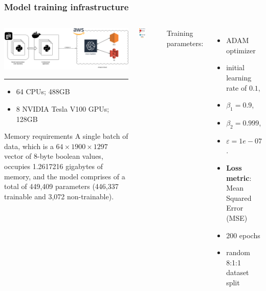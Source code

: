 \documentclass[a4paper,9pt]{beamer}
\theoremstyle{mytheoremstyle}
\begin{document}
\begin{frame}
\frametitle{Model training infrastructure}
\begin{columns}
\begin{column}{0.7\textwidth}
\begin{center}
  \includegraphics[width=\textwidth]{res/cloud_training}
\end{center}
\hrule
\begin{itemize}
\item 64 CPUs; 488GB
\item 8 NVIDIA Tesla V100 GPUs; 128GB
\end{itemize}
\scriptsize{
\begin{exampleblock}{Memory requirements}
A single batch of data, which is a $64\times1900\times1297$ vector of 8-byte boolean
values, occupies 1.2617216 gigabytes of memory, and the model comprises of a total
of 449,409 parameters (446,337 trainable and 3,072 non-trainable).
\end{exampleblock}
}
\end{column}
\vrule{}
\begin{center}
\includegraphics[width=2cm]{res/implementation_framework}
\end{center}
\hrule
\vspace{0.1cm}
\scriptsize{
Training parameters:
\begin{itemize}
\item ADAM optimizer
\item initial learning rate of $0.1$,
\item $\beta_{1} = 0.9$,
\item $\beta_{2} = 0.999$,
\item $\varepsilon = 1e-07$.
\item \textbf{Loss metric}: Mean Squared Error (MSE)
\item 200 epochs
\item random 8:1:1 dataset split
\end{itemize}
}
\end{columns}
\end{frame}
\end{document}
